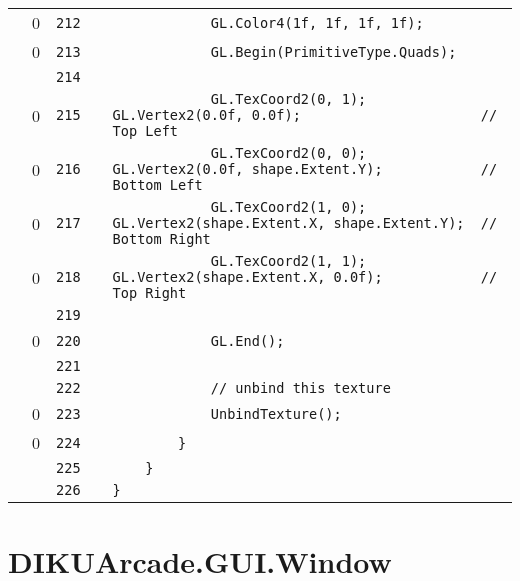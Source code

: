 \documentclass[a4paper,landscape,10pt]{article}
\begin{document}
\begin{longtable}[l]{lrrll}
\cellcolor{red} & 0 & \verb~212~ & & \verb~            GL.Color4(1f, 1f, 1f, 1f);~\\
\cellcolor{red} & 0 & \verb~213~ & & \verb~            GL.Begin(PrimitiveType.Quads);~\\
\cellcolor{gray} &  & \verb~214~ & & \verb~~\\
\cellcolor{red} & 0 & \verb~215~ & & \verb~            GL.TexCoord2(0, 1); GL.Vertex2(0.0f, 0.0f);                      // Top Left~\\
\cellcolor{red} & 0 & \verb~216~ & & \verb~            GL.TexCoord2(0, 0); GL.Vertex2(0.0f, shape.Extent.Y);            // Bottom Left~\\
\cellcolor{red} & 0 & \verb~217~ & & \verb~            GL.TexCoord2(1, 0); GL.Vertex2(shape.Extent.X, shape.Extent.Y);  // Bottom Right~\\
\cellcolor{red} & 0 & \verb~218~ & & \verb~            GL.TexCoord2(1, 1); GL.Vertex2(shape.Extent.X, 0.0f);            // Top Right~\\
\cellcolor{gray} &  & \verb~219~ & & \verb~~\\
\cellcolor{red} & 0 & \verb~220~ & & \verb~            GL.End();~\\
\cellcolor{gray} &  & \verb~221~ & & \verb~~\\
\cellcolor{gray} &  & \verb~222~ & & \verb~            // unbind this texture~\\
\cellcolor{red} & 0 & \verb~223~ & & \verb~            UnbindTexture();~\\
\cellcolor{red} & 0 & \verb~224~ & & \verb~        }~\\
\cellcolor{gray} &  & \verb~225~ & & \verb~    }~\\
\cellcolor{gray} &  & \verb~226~ & & \verb~}~\\
\end{longtable}
\newpage
\section{DIKUArcade.GUI.Window}
\end{document}
